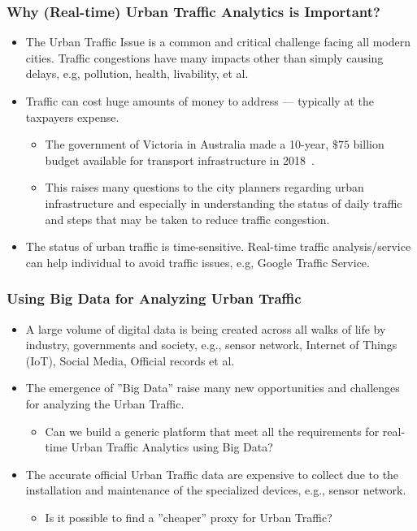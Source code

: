\begin{frame}
    \frametitle{Why (Real-time) Urban Traffic Analytics is Important?}
    \begin{itemize}
	    \item The Urban Traffic Issue is a common and critical challenge facing all modern cities. Traffic congestions have many impacts other than simply causing delays, e.g, pollution, health, livability, et al.
	    \item Traffic can cost huge amounts of money to address --- typically at the taxpayers expense.
	    \begin{itemize}
            \item The government of Victoria in Australia made a 10-year, ${\$75}$ billion budget available for transport infrastructure in 2018~\cite{10YInvVic}.
            \item This raises many questions to the city planners regarding urban infrastructure and especially in understanding the status of daily traffic and steps that may be taken to reduce traffic congestion.
        \end{itemize}
        \item The status of urban traffic is time-sensitive. Real-time traffic analysis/service can help individual to avoid traffic issues, e.g, Google Traffic Service.
    \end{itemize}
\end{frame}

\begin{frame}
    \frametitle{Using Big Data for Analyzing Urban Traffic}
    \begin{itemize}
	    \item A large volume of digital data is being created across all walks of life by industry, governments and society, e.g., sensor network, Internet of Things (IoT), Social Media, Official records et al.
	    \item The emergence of ''Big Data'' raise many new opportunities and challenges for analyzing the Urban Traffic.
	    \begin{itemize}
	        \item Can we build a generic platform that meet all the requirements for real-time Urban Traffic Analytics using Big Data?
	    \end{itemize}
	    \item The accurate official Urban Traffic data are expensive to collect due to the installation and maintenance of the specialized devices, e.g., sensor network. 
	    \begin{itemize}
	        \item Is it possible to find a ''cheaper'' proxy for Urban Traffic?
	    \end{itemize}
    \end{itemize}
\end{frame}


